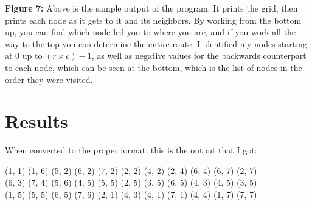 \documentclass[12pt]{article}
\begin{document}
\begin{center}
    \textbf{Figure 7:} Above is the sample output of the program. It prints
    the grid, then prints each node as it gets to it and its neighbors. By 
    working from the bottom up, you can find which node led you to where you
    are, and if you work all the way to the top you can determine the entire
    route. I identified my nodes starting at 0 up to $(r\times c) - 1$, as well
    as negative values for the backwards counterpart to each node, which can be
    seen at the bottom, which is the list of nodes in the order they were visited.
\end{center}
\pagebreak

\section{Results}
When converted to the proper format, this is the output that I got:

(1, 1) (1, 6) (5, 2) (6, 2) (7, 2) (2, 2) (4, 2) (2, 4) (6, 4) (6, 7) (2, 7)\\
(6, 3) (7, 4) (5, 6) (4, 5) (5, 5) (2, 5) (3, 5) (6, 5) (4, 3) (4, 5) (3, 5)\\
(1, 5) (5, 5) (6, 5) (7, 6) (2, 1) (4, 3) (4, 1) (7, 1) (4, 4) (1, 7) (7, 7)
\end{document}
